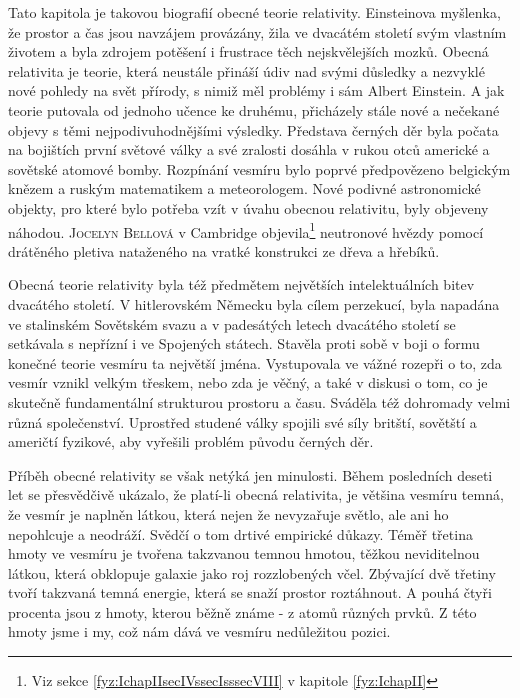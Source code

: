  Tato kapitola je takovou biografií obecné teorie relativity. Einsteinova myšlenka, že prostor a
  čas jsou navzájem provázány, žila ve dvacátém století svým vlastním životem a byla zdrojem
  potěšení i frustrace těch nejskvělejších mozků. Obecná relativita je teorie, která neustále
  přináší údiv nad svými důsledky a nezvyklé nové pohledy na svět přírody, s nimiž měl problémy i
  sám Albert Einstein. A jak teorie putovala od jednoho učence ke druhému, přicházely stále nové a
  nečekané objevy s těmi nejpodivuhodnějšími výsledky. Představa černých děr byla počata na
  bojištích první světové války a své zralosti dosáhla v rukou otců americké a sovětské atomové
  bomby. Rozpínání vesmíru bylo poprvé předpovězeno belgickým knězem a ruským matematikem a
  meteorologem. Nové podivné astronomické objekty, pro které bylo potřeba vzít v úvahu obecnou
  relativitu, byly objeveny náhodou. \textsc{Jocelyn Bellová} v Cambridge objevila\footnote{Viz
  sekce \ref{fyz:IchapIIsecIVssecIsssecVIII} v kapitole \ref{fyz:IchapII}} neutronové hvězdy pomocí
  drátěného pletiva nataženého na vratké konstrukci ze dřeva a hřebíků. 

  Obecná teorie relativity byla též předmětem největších intelektuálních bitev dvacátého století. V
  hitlerovském Německu byla cílem perzekucí, byla napadána ve stalinském Sovětském svazu a v
  padesátých letech dvacátého století se setkávala s nepřízní i ve Spojených státech. Stavěla proti
  sobě v boji o formu konečné teorie vesmíru ta největší jména. Vystupovala ve vážné rozepři o to,
  zda vesmír vznikl velkým třeskem, nebo zda je věčný, a také v diskusi o tom, co je skutečně
  fundamentální strukturou prostoru a času. Sváděla též dohromady velmi různá společenství.
  Uprostřed studené války spojili své síly britští, sovětští a američtí fyzikové, aby vyřešili
  problém původu černých děr. 

  Příběh obecné relativity se však netýká jen minulosti. Během posledních deseti let se přesvědčivě
  ukázalo, že platí-li obecná relativita, je většina vesmíru temná, že vesmír je naplněn látkou,
  která nejen že nevyzařuje světlo, ale ani ho nepohlcuje a neodráží. Svědčí o tom drtivé empirické
  důkazy. Téměř třetina hmoty ve vesmíru je tvořena takzvanou temnou hmotou, těžkou neviditelnou
  látkou, která obklopuje galaxie jako roj rozzlobených včel. Zbývající dvě třetiny tvoří takzvaná
  temná energie, která se snaží prostor roztáhnout. A pouhá čtyři procenta jsou z hmoty, kterou
  běžně známe - z atomů různých prvků. Z této hmoty jsme i my, což nám dává ve vesmíru nedůležitou
  pozici. 

